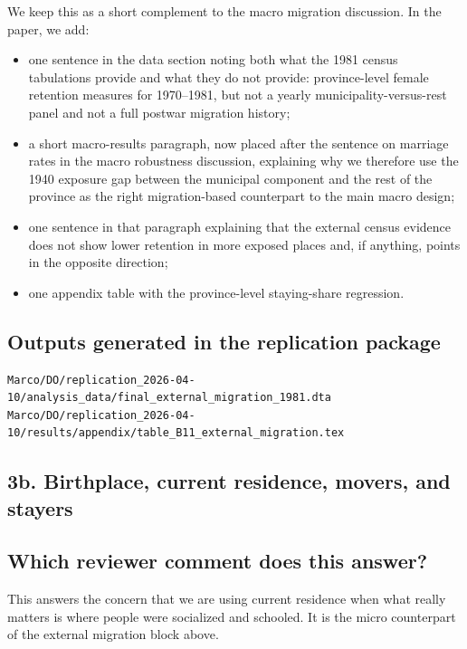 \documentclass[11pt]{article}
\begin{document}
We keep this as a short complement to the macro migration discussion. In the paper, we add:
\begin{itemize}[leftmargin=*]
\item one sentence in the data section noting both what the 1981 census tabulations provide and what they do not provide: province-level female retention measures for 1970--1981, but not a yearly municipality-versus-rest panel and not a full postwar migration history;
\item a short macro-results paragraph, now placed after the sentence on marriage rates in the macro robustness discussion, explaining why we therefore use the 1940 exposure gap between the municipal component and the rest of the province as the right migration-based counterpart to the main macro design;
\item one sentence in that paragraph explaining that the external census evidence does not show lower retention in more exposed places and, if anything, points in the opposite direction;
\item one appendix table with the province-level staying-share regression.
\end{itemize}

\subsection*{Outputs generated in the replication package}

\begin{verbatim}
Marco/DO/replication_2026-04-10/analysis_data/final_external_migration_1981.dta
Marco/DO/replication_2026-04-10/results/appendix/table_B11_external_migration.tex
\end{verbatim}

\subsection*{3b. Birthplace, current residence, movers, and stayers}\label{sec:migration-3b}

\subsection*{Which reviewer comment does this answer?}

This answers the concern that we are using current residence when what really matters is where people were socialized and schooled. It is the micro counterpart of the external migration block above.
\end{document}
